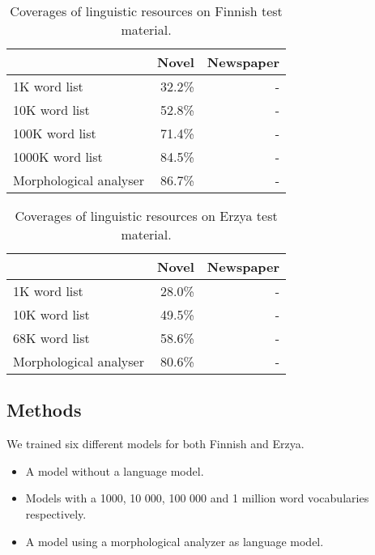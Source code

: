\documentclass[b5paper]{article}
\begin{document}
\begin{table}[!htb]
\begin{center}
\begin{tabular}{lrr}
\hline 
                        & Novel   & Newspaper \\
\hline 
1K word list            &  32.2\% &         - \\
10K word list           &  52.8\% &         - \\
100K word list          &  71.4\% &         - \\
1000K word list         &  84.5\% &         - \\
Morphological analyser  &  86.7\% &         - \\
\hline 
\end{tabular}
\caption{Coverages of linguistic resources on Finnish test material.}\label{fin-coverage}
\end{center}
\end{table}

\begin{table}[!htb]
\begin{center}
\begin{tabular}{lrr}
\hline 
                        & Novel     & Newspaper \\
\hline 
1K word list            &   28.0\%  &         - \\
10K word list           &   49.5\%  &         - \\
68K word list           &   58.6\%  &         - \\
Morphological analyser  &   80.6\%  &         - \\ 
\hline 
\end{tabular}
\caption{Coverages of linguistic resources on Erzya test material.}\label{myv-coverage}
\end{center}
\end{table}

\subsection{Methods}
We trained six different models for both Finnish and Erzya.
\begin{itemize}
\item A model without a language model.
\item Models with a 1000, 10 000, 100 000 and 1 million word vocabularies respectively.
\item A model using a morphological analyzer as language model.
\end{itemize}
\end{document}

